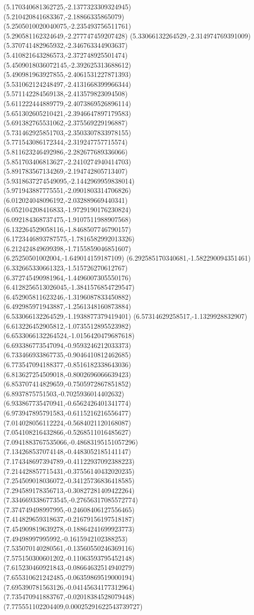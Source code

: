 {(5.170340681362725,-2.1377323309324945)
(5.210420841683367,-2.18866335865079)
(5.2505010020040075,-2.235493756511761)
(5.290581162324649,-2.277747459207428)
(5.33066132264529,-2.314974769391009)
(5.370741482965932,-2.346763344903637)
(5.410821643286573,-2.372748925501474)
(5.4509018036072145,-2.392625313688612)
(5.490981963927855,-2.4061531227871393)
(5.531062124248497,-2.4131668399966344)
(5.571142284569138,-2.413579823094508)
(5.611222444889779,-2.4073869526896114)
(5.651302605210421,-2.3946647897179583)
(5.691382765531062,-2.375569229196887)
(5.731462925851703,-2.3503307833978155)
(5.771543086172344,-2.319247757715574)
(5.811623246492986,-2.282677689336066)
(5.851703406813627,-2.2410274940414703)
(5.891783567134269,-2.194742805713407)
(5.9318637274549095,-2.1442969959838014)
(5.971943887775551,-2.0901803314706826)
(6.012024048096192,-2.032889669440341)
(6.052104208416833,-1.9729190176230824)
(6.092184368737475,-1.9107511988907568)
(6.132264529058116,-1.8468507746790157)
(6.1723446893787575,-1.7816582992013326)
(6.212424849699398,-1.7155859046851607)
(6.25250501002004,-1.649014159187109)
(6.292585170340681,-1.582290094351461)
(6.332665330661323,-1.515726270612767)
(6.372745490981964,-1.4496007305550176)
(6.4128256513026045,-1.3841576854729547)
(6.452905811623246,-1.3196087833450882)
(6.492985971943887,-1.2561348160873884)
(6.533066132264529,-1.1938877379419401)
(6.57314629258517,-1.1329928832907)
(6.613226452905812,-1.0735512895523982)
(6.6533066132264524,-1.0156420479687618)
(6.693386773547094,-0.9593246212033373)
(6.733466933867735,-0.9046410812462685)
(6.773547094188377,-0.8516182338643036)
(6.813627254509018,-0.8002696066639423)
(6.853707414829659,-0.7505972867851852)
(6.8937875751503,-0.7025936014402632)
(6.933867735470941,-0.6562426401341774)
(6.973947895791583,-0.6115216216556477)
(7.014028056112224,-0.5684021120168087)
(7.054108216432866,-0.5268511016485627)
(7.0941883767535066,-0.48683195151057296)
(7.134268537074148,-0.4483052185141147)
(7.174348697394789,-0.41122937092388223)
(7.214428857715431,-0.37556140432020235)
(7.254509018036072,-0.34125736836418585)
(7.294589178356713,-0.30827281409422264)
(7.3346693386773545,-0.27656317085572774)
(7.374749498997995,-0.24608406127556465)
(7.414829659318637,-0.21679156197518187)
(7.454909819639278,-0.18864241699923773)
(7.49498997995992,-0.1615942102388253)
(7.535070140280561,-0.13560550246369116)
(7.575150300601202,-0.11063593795452148)
(7.615230460921843,-0.08664632514940279)
(7.655310621242485,-0.06359869519000194)
(7.695390781563126,-0.04145634177312964)
(7.735470941883767,-0.02018384528079448)
(7.775551102204409,0.00025291622543739727)
}
